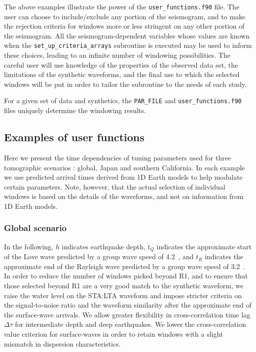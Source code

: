  The above examples illustrate the power of the {\tt user\_functions.f90} file.  The user can choose to include/exclude any portion of the seismogram, and to make the rejection criteria for windows more or less stringent on any other portion of the seismogram.  All the seismogram-dependent variables whose values are known when the {\tt set\_up\_criteria\_arrays} subroutine is executed may be used to inform these choices, leading to an infinite number of windowing possibilities.  The careful user will use knowledge of the properties of the observed data set, the limitations of the synthetic waveforms, and the final use to which the selected windows will be put in order to tailor the subroutine to the needs of each study.  
 
 For a given set of data and synthetics, the {\tt PAR\_FILE} and {\tt user\_functions.f90} files uniquely determine the windowing results.

\subsection{Examples of user functions\label{ap:user_fn}}

Here we present the time dependencies of tuning parameters used for three tomographic scenarios \citep{MaggiEtal2009}: global, Japan and southern California.
In each example we use predicted arrival times derived from 1D Earth models to help modulate certain parameters. Note, however, that the actual selection of individual windows is based on the details of the waveforms, and not on information from 1D Earth models.

\subsubsection{Global scenario\label{ap:user_global}}

In the following, $h$ indicates earthquake depth, $t_Q$ indicates the approximate start of the Love wave predicted by a group wave speed of 4.2~\kmps, and $t_R$ indicates the approximate end of the Rayleigh wave predicted by a group wave speed of 3.2~\kmps. In order to reduce the number of windows picked beyond R1, and to ensure that those selected beyond R1 are a very good match to the synthetic waveform, we raise the water level on the STA:LTA waveform and impose stricter criteria on the signal-to-noise ratio and the waveform similarity after the approximate end of the surface-wave arrivals.  We allow greater flexibility in cross-correlation time lag $\Delta\tau$ for intermediate depth and deep earthquakes.  We lower the cross-correlation value criterion for surface-waves in order to retain windows with a slight mismatch in dispersion characteristics.

